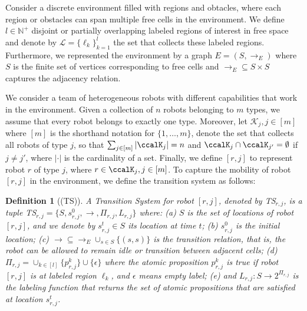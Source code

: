 \documentclass[Afour,sageh,times]{sagej}
\newtheorem{defn}[thm]{Definition}
\begin{document}
 Consider a discrete environment filled with regions and obtacles, where each region or obstacles can span multiple free cells in the environment. We define $l\in \mathbb{N}^+$ disjoint or partially overlapping labeled regions of interest in free space and denote by $\mathcal{L}=\{\ell_k\}_{k=1}^{l}$ the set that collects these labeled regions. Furthermore, we represented the environment by a graph $E = (S, \to_E)$ where $S$ is the finite set of vertices corresponding to free cells and $\to_{E} \subseteq S \times S$ captures the adjacency relation.

 We consider a team of heterogeneous robots with different capabilities that work in the environment. Given a collection of $n$ robots belonging to $m$ types, we assume that every robot belongs to exactly one type. Moreover, let $\mathcal{K}_j, j\in[m]$ where $[m]$ is the shorthand notation for  $\{1,\ldots,m\}$, denote the set that  collects all robots of type $j$, so that $\sum_{j\in [m]} |\ccalK_j| = n$ and $\ccalK_{j} \cap \ccalK_{j'} = \emptyset$ if $j \not= j'$, where $|\cdot|$ is the cardinality of a set. Finally, we define $[r,j]$ to represent robot $r$ of type $j$, where $r\in \ccalK_j, j\in [m]$. To capture the mobility of robot $[r,j]$ in the environment, we define the { transition system} as follows:

\begin{defn}[(TS)]\label{def:ts}
  A { Transition System} for robot $[r,j]$, denoted by TS$_{r,j}$, is a tuple TS$_{r,j} = \{S, s_{r,j}^0, \to, \Pi_{r,j}, L_{r,j}\}$ where: (a) $S$ is the set of locations of robot $[r,j]$, and we denote by $s_{r,j}^t \in S$ its location at time $t$; (b) $s_{r,j}^0$ is the initial location; (c) $\to \subseteq \to_{E} \cup_{s\in S} \{(s,s)\} $ is the transition relation, that is, the robot can be allowed to remain idle or transition between adjacent cells; (d) $\Pi_{r,j} = \cup_{k\in [l]}\{p_{r,j}^k\} \cup \{\epsilon\}$ where the atomic proposition $p_{r,j}^{k}$ is true if robot $[r,j]$ is at labeled region $\ell_k$, and $\epsilon$ means empty label; (e) and $L_{r,j}: S \to 2^{\Pi_{r,j}} $ is the labeling function that returns the set of atomic propositions that are satisfied at location $s_{r,j}^t$.
\end{defn}
\end{document}
